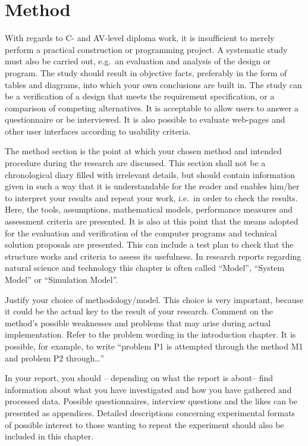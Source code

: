 \section{Method}\label{sec:method}
With regards to C- and AV-level diploma work, it is insufficient to merely
perform a practical construction or programming project. A systematic study must
also be carried out, e.g.\ an evaluation and analysis of the design or program.
The study should result in objective facts, preferably in the form of tables and
diagrams, into which your own conclusions are built in. The study can be a
verification of a design that meets the requirement specification, or a
comparison of competing alternatives. It is acceptable to allow users to answer
a questionnaire or be interviewed. It is also possible to evaluate web-pages and
other user interfaces according to usability criteria.

The method section is the point at which your chosen method and intended
procedure during the research are discussed. This section shall not be a
chronological diary filled with irrelevant details, but should contain
information given in such a way that it is understandable for the reader and
enables him/her to interpret your results and repeat your work, i.e.\ in order to
check the results. Here, the tools, assumptions, mathematical models,
performance measures and assessment criteria are presented. It is also at this
point that the means adopted for the evaluation and verification of the computer
programs and technical solution proposals are presented. This can include a test
plan to check that the structure works and criteria to assess its usefulness. In
research reports regarding natural science and technology this chapter is often
called ``Model'', ``System Model'' or ``Simulation Model''.

Justify your choice of methodology/model. This choice is very important, because
it could be the actual key to the result of your research. Comment on the
method's possible weaknesses and problems that may arise during actual
implementation. Refer to the problem wording in the introduction chapter. It is
possible, for example, to write ``problem P1 is attempted through the method M1
and problem P2 through\dots''

In your report, you should – depending on what the report is about– find
information about what you have investigated and how you have gathered and
processed data. Possible questionnaires, interview questions and the likes can
be presented as appendices. Detailed descriptions concerning experimental
formats of possible interest to those wanting to repeat the experiment should
also be included in this chapter.

